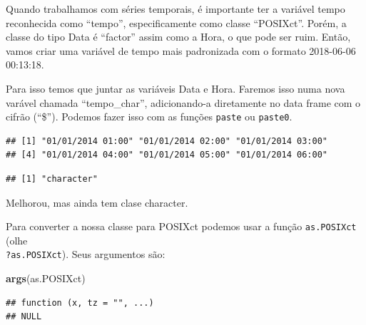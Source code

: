 \documentclass[]{book}
\newenvironment{Shaded}{\begin{snugshade}}{\end{snugshade}}
\newcommand{\KeywordTok}[1]{\textcolor[rgb]{0.13,0.29,0.53}{\textbf{#1}}}
\newcommand{\StringTok}[1]{\textcolor[rgb]{0.31,0.60,0.02}{#1}}
\newcommand{\OperatorTok}[1]{\textcolor[rgb]{0.81,0.36,0.00}{\textbf{#1}}}
\newcommand{\NormalTok}[1]{#1}
\theoremstyle{definition}
\theoremstyle{definition}
\theoremstyle{definition}
\theoremstyle{remark}
\begin{document}
Quando trabalhamos com séries temporais, é importante ter a variável
tempo reconhecida como ``tempo'', especificamente como classe
``POSIXct''. Porém, a classe do tipo Data é ``factor'' assim como a
Hora, o que pode ser ruim. Então, vamos criar uma variável de tempo mais
padronizada com o formato 2018-06-06 00:13:18.

Para isso temos que juntar as variáveis Data e Hora. Faremos isso numa
nova varável chamada ``tempo\_char'', adicionando-a diretamente no data
frame com o cifrão (``\$''). Podemos fazer isso com as funções
\texttt{paste} ou \texttt{paste0}.

\begin{Shaded}
\end{Shaded}

\begin{verbatim}
## [1] "01/01/2014 01:00" "01/01/2014 02:00" "01/01/2014 03:00"
## [4] "01/01/2014 04:00" "01/01/2014 05:00" "01/01/2014 06:00"
\end{verbatim}

\begin{Shaded}
\end{Shaded}

\begin{verbatim}
## [1] "character"
\end{verbatim}

Melhorou, mas ainda tem clase character.

Para converter a nossa classe para POSIXct podemos usar a função
\texttt{as.POSIXct} (olhe\\
\texttt{?as.POSIXct}). Seus argumentos são:

\begin{Shaded}
\begin{Highlighting}[]
\KeywordTok{args}\NormalTok{(as.POSIXct)}
\end{Highlighting}
\end{Shaded}

\begin{verbatim}
## function (x, tz = "", ...) 
## NULL
\end{verbatim}
\end{document}
